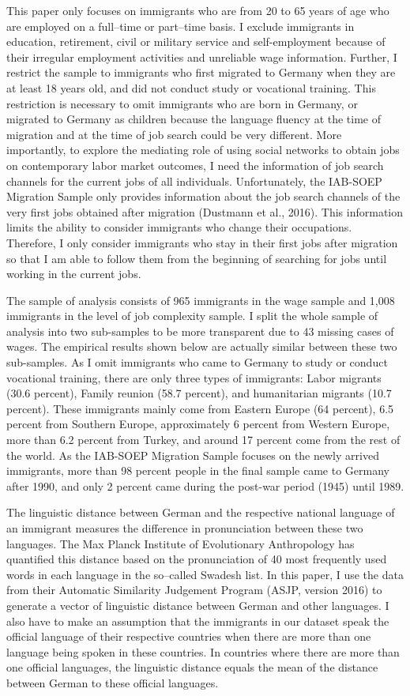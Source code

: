 \documentclass[12pt,a4paper]{article}
\begin{document}
This paper only focuses on immigrants who are from 20 to 65 years of age who are employed on a full--time or part--time basis. I exclude immigrants in education, retirement, civil or military service and self-employment because of their irregular employment activities and unreliable wage information. Further, I restrict the sample to immigrants who first migrated to Germany when they are at least 18 years old, and did not conduct study or vocational training. This restriction is necessary to omit immigrants who are born in Germany, or migrated to Germany as children because the language fluency at the time of migration and at the time of job search could be very different. More importantly, to explore the mediating role of using social networks to obtain jobs on contemporary labor market outcomes, I need the information of job search channels for the current jobs of all individuals. Unfortunately, the IAB-SOEP Migration Sample only provides information about the job search channels of the very first jobs obtained after migration (Dustmann et al., 2016). This information limits the ability to consider immigrants who change their occupations. Therefore, I only consider immigrants who stay in their first jobs after migration so that I am able to follow them from the beginning of searching for jobs until working in the current jobs. 

The sample of analysis consists of 965 immigrants in the wage sample and 1,008 immigrants in the level of job complexity sample. I split the whole sample of analysis into two sub-samples to be more transparent due to 43 missing cases of wages. The empirical results shown below are actually similar between these two sub-samples. As I omit immigrants who came to Germany to study or conduct vocational training, there are only three types of immigrants: Labor migrants (30.6 percent), Family reunion (58.7 percent), and humanitarian migrants (10.7 percent). These immigrants mainly come from Eastern Europe (64 percent), 6.5 percent from Southern Europe, approximately 6 percent from Western Europe, more than 6.2 percent from Turkey, and around 17 percent come from the rest of the world. As the IAB-SOEP Migration Sample focuses on the newly arrived immigrants, more than 98 percent people in the final sample came to Germany after 1990, and only 2 percent came during the post-war period (1945) until 1989. 

The linguistic distance between German and the respective national language of an immigrant measures the difference in pronunciation between these two languages. The Max Planck Institute of Evolutionary Anthropology has quantified this distance based on the pronunciation of 40 most frequently used words in each language in the so--called Swadesh list. In this paper, I use the data from their Automatic Similarity Judgement Program (ASJP, version 2016) to generate a vector of linguistic distance between German and other languages. I also have to make an assumption that the immigrants in our dataset speak the official language of their respective countries when there are more than one language being spoken in these countries. In countries where there are more than one official languages, the linguistic distance equals the mean of the distance between German to these official languages.
\end{document}
